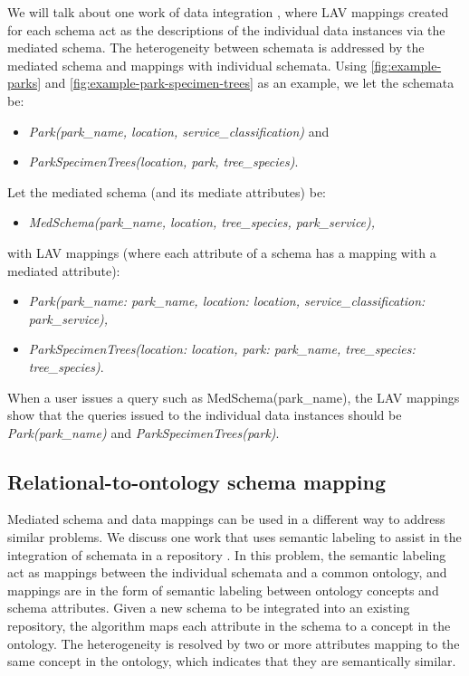 We will talk about one work of data integration \cite{Levy1996Querying}, where LAV mappings created for each schema act as the descriptions of the individual data instances via the mediated schema. The heterogeneity between schemata is addressed by the mediated schema and mappings with individual schemata. Using \autoref{fig:example-parks} and \autoref{fig:example-park-specimen-trees} as an example, we let the schemata be:
\begin{itemize}
	\item[] \textit{Park(park\_name, location, service\_classification)} and
	\item[] \textit{ParkSpecimenTrees(location, park, tree\_species)}.
\end{itemize}
Let the mediated schema (and its mediate attributes) be:
\begin{itemize}
	\item[] \textit{MedSchema(park\_name, location, tree\_species, park\_service),}
\end{itemize}
with LAV mappings (where each attribute of a schema has a mapping with a mediated attribute):
\begin{itemize}
	\item[] \textit{Park(park\_name: park\_name, location: location, service\_classification: park\_service),}
	\item[] \textit{ParkSpecimenTrees(location: location, park: park\_name, tree\_species: tree\_species)}.
\end{itemize}
When a user issues a query such as MedSchema(park\_name), the LAV mappings show that the queries issued to the individual data instances should be \textit{Park(park\_name)} and \textit{ParkSpecimenTrees(park)}.

\subsection{Relational-to-ontology schema mapping}

Mediated schema and data mappings can be used in a different way to address similar problems. We discuss one work that uses semantic labeling to assist in the integration of schemata in a repository \cite{Diego2018Machine}. In this problem, the semantic labeling act as mappings between the individual schemata and a common ontology, and mappings are in the form of semantic labeling between ontology concepts and schema attributes. Given a new schema to be integrated into an existing repository, the algorithm maps each attribute in the schema to a concept in the ontology. The heterogeneity is resolved by two or more attributes mapping to the same concept in the ontology, which indicates that they are semantically similar.

